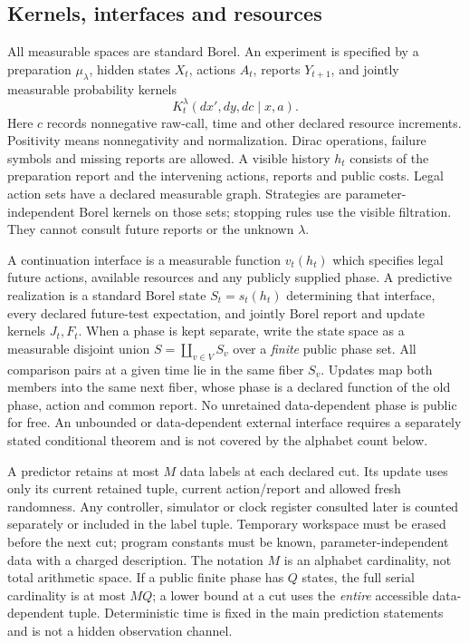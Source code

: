 \subsection{Kernels, interfaces and resources}
All measurable spaces are standard Borel. An experiment is specified by a preparation $\mu_\lambda$, hidden states $X_t$, actions $A_t$, reports $Y_{t+1}$, and jointly measurable probability kernels
\begin{equation}\label{eq:kernel}
 K_t^\lambda(dx',dy,dc\mid x,a).
\end{equation}
Here $c$ records nonnegative raw-call, time and other declared resource increments. Positivity means nonnegativity and normalization. Dirac operations, failure symbols and missing reports are allowed. A visible history $h_t$ consists of the preparation report and the intervening actions, reports and public costs. Legal action sets have a declared measurable graph. Strategies are parameter-independent Borel kernels on those sets; stopping rules use the visible filtration. They cannot consult future reports or the unknown $\lambda$.

A continuation interface is a measurable function $v_t(h_t)$ which specifies legal future actions, available resources and any publicly supplied phase. A predictive realization is a standard Borel state $S_t=s_t(h_t)$ determining that interface, every declared future-test expectation, and jointly Borel report and update kernels $J_t,F_t$. When a phase is kept separate, write the state space as a measurable disjoint union $S=\coprod_{v\in V}S_v$ over a \emph{finite} public phase set. All comparison pairs at a given time lie in the same fiber $S_v$. Updates map both members into the same next fiber, whose phase is a declared function of the old phase, action and common report. No unretained data-dependent phase is public for free. An unbounded or data-dependent external interface requires a separately stated conditional theorem and is not covered by the alphabet count below.

A predictor retains at most $M$ data labels at each declared cut. Its update uses only its current retained tuple, current action/report and allowed fresh randomness. Any controller, simulator or clock register consulted later is counted separately or included in the label tuple. Temporary workspace must be erased before the next cut; program constants must be known, parameter-independent data with a charged description. The notation $M$ is an alphabet cardinality, not total arithmetic space. If a public finite phase has $Q$ states, the full serial cardinality is at most $MQ$; a lower bound at a cut uses the \emph{entire} accessible data-dependent tuple. Deterministic time is fixed in the main prediction statements and is not a hidden observation channel.

